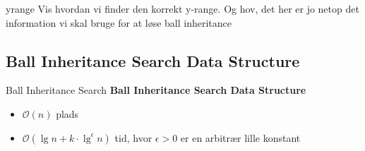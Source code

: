 \documentclass[pdf]{beamer}
\begin{document}
\begin{frame}{yrange}
  Vis hvordan vi finder den korrekt y-range. Og hov, det her er jo netop det information vi skal bruge for at løse ball inheritance
\end{frame}

\subsection{Ball Inheritance Search Data Structure}
\begin{frame}{Ball Inheritance Search}
  \textbf{Ball Inheritance Search Data Structure}
  \begin{itemize}
    \item $\mathcal{O}(n)$ plads
    \item $\mathcal{O}(\lg n + k\cdot\lg^\epsilon n)$ tid, hvor $\epsilon > 0$ er en arbitrær lille konstant
  \end{itemize}
\end{frame}
\end{document}
